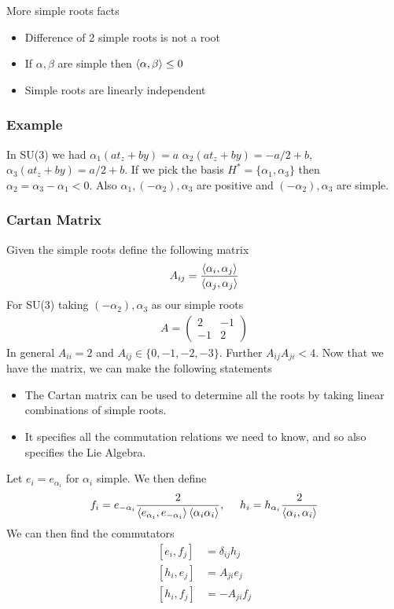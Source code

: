 \documentclass[a4paper,12pt]{article}
\begin{document}
More simple roots facts
\begin{itemize}
	\item Difference of 2 simple roots is not a root
	\item If $\alpha,\beta$ are simple then $\expval{\alpha,\beta}\leq 0$
	\item Simple roots are linearly independent
\end{itemize}
\subsubsection{Example}
In SU(3) we had $\alpha_1(a t_z+b y)=a$ $\alpha_2(a t_z+b y)=-a/2+b$, $\alpha_3(a t_z+b y)=a/2+b$. If we pick the basis $H^*=\{\alpha_1,\alpha_3\}$ then $\alpha_2=\alpha_3-\alpha_1<0$. Also $\alpha_1,(-\alpha_2),\alpha_3$ are positive and $(-\alpha_2),\alpha_3$ are simple. 
\subsubsection{Cartan Matrix}
Given the simple roots define the following matrix
\begin{equation}
	\begin{aligned}
		A_{ij}=\frac{\expval{\alpha_i,\alpha_j}}{\expval{\alpha_j,\alpha_j}}
	\end{aligned}
\end{equation}
For SU(3) taking $(-\alpha_2),\alpha_3$ as our simple roots
\begin{equation}
	\begin{aligned}
		A=\begin{pmatrix}
			2 & -1 \\
			-1 & 2
		\end{pmatrix}
	\end{aligned}
\end{equation}
In general $A_{ii}=2$ and $A_{ij}\in\{0,-1,-2,-3\}$. Further $A_{ij} A_{ji}<4$. Now that we have the matrix, we can make the following statements
\begin{itemize}
\item  The Cartan matrix can be used to determine all the roots by taking linear combinations of simple roots.
\item It specifies all the commutation relations we need to know, and so also specifies the Lie Algebra.
\end{itemize}
Let $e_i=e_{\alpha_i}$ for $\alpha_i$ simple. We then define
\begin{equation}
	\begin{aligned}
		f_i=e_{-\alpha_i}\frac{2}{\expval{e_{\alpha_i},e_{-\alpha_i}}\expval{\alpha_i\alpha_i}},~~~~h_i=h_{\alpha_i}\frac{2}{\expval{\alpha_i,\alpha_i}}
	\end{aligned}
\end{equation}
We can then find the commutators
\begin{equation}
	\begin{aligned}
		\left[e_i,f_j\right]&=\delta_{ij}h_j\\
		[h_i,e_j]&=A_{ji}e_j\\
		[h_i,f_j]&=-A_{ji}f_j
	\end{aligned}
\end{equation}
\end{document}

